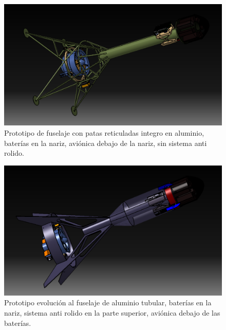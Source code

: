 \begin{figure}[htb]
    \centering
    \includegraphics[width=\linewidth]{fig/design/0}
    \caption{Prototipo de fuselaje con patas reticuladas integro en aluminio, baterías en la nariz, aviónica debajo de la nariz, sin sistema anti rolido.}
    \label{fig:design/0}
\end{figure}


\begin{figure}[htb]
    \centering
    \includegraphics[width=\linewidth]{fig/design/1}
    \caption{Prototipo evolución al fuselaje de aluminio tubular, baterías en la nariz, sistema anti rolido en
    la parte superior, aviónica debajo de las baterías.}
    \label{fig:design/1}
\end{figure}

